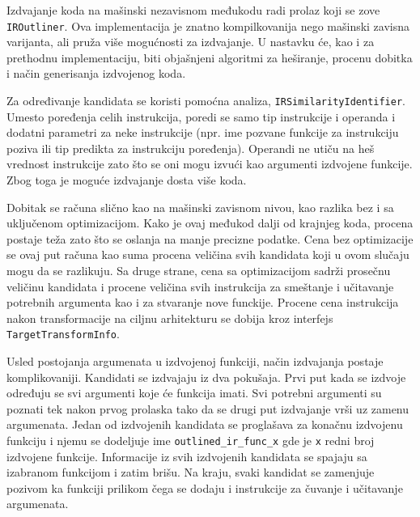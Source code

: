 \documentclass[12pt,oneside]{memoir}
\begin{document}
Izdvajanje koda na mašinski nezavisnom međukodu radi prolaz koji se zove \verb|IROutliner|.
Ova implementacija je znatno kompilkovanija nego mašinski zavisna varijanta, ali pruža više mogućnosti za izdvajanje.
U nastavku će, kao i za prethodnu implementaciju, biti objašnjeni algoritmi za heširanje, procenu dobitka i način generisanja izdvojenog koda.

Za određivanje kandidata se koristi pomoćna analiza, \verb|IRSimilarityIdentifier|.
Umesto poređenja celih instrukcija, poredi se samo tip instrukcije i operanda i dodatni parametri za neke instrukcije (npr. ime pozvane funkcije za instrukciju poziva ili tip predikta za instrukciju poređenja).
Operandi ne utiču na heš vrednost instrukcije zato što se oni mogu izvući kao argumenti izdvojene funkcije.
Zbog toga je moguće izdvajanje dosta više koda.

Dobitak se računa slično kao na mašinski zavisnom nivou, kao razlika bez i sa uključenom optimizacijom.
Kako je ovaj međukod dalji od krajnjeg koda, procena postaje teža zato što se oslanja na manje precizne podatke.
Cena bez optimizacije se ovaj put računa kao suma procena veličina svih kandidata koji u ovom slučaju mogu da se razlikuju.
Sa druge strane, cena sa optimizacijom sadrži prosečnu veličinu kandidata i procene veličina svih instrukcija za smeštanje i učitavanje potrebnih argumenta kao i za stvaranje nove funckije.
Procene cena instrukcija nakon transformacije na ciljnu arhitekturu se dobija kroz interfejs \verb|TargetTransformInfo|.

Usled postojanja argumenata u izdvojenoj funkciji, način izdvajanja postaje komplikovaniji.
Kandidati se izdvajaju iz dva pokušaja. Prvi put kada se izdvoje određuju se svi argumenti koje će funkcija imati.
Svi potrebni argumenti su poznati tek nakon prvog prolaska tako da se drugi put izdvajanje vrši uz zamenu argumenata.
Jedan od izdvojenih kandidata se proglašava za konačnu izdvojenu funkciju i
njemu se dodeljuje ime \verb|outlined_ir_func_x| gde je \verb|x| redni broj izdvojene funkcije.
Informacije iz svih izdvojenih kandidata se spajaju sa izabranom funkcijom i zatim brišu.
Na kraju, svaki kandidat se zamenjuje pozivom ka funkciji prilikom čega se dodaju i instrukcije za čuvanje i učitavanje argumenata.
\end{document}
